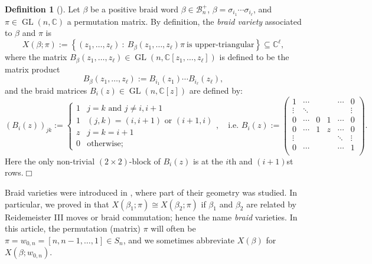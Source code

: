 \documentclass[10pt]{amsart}
\theoremstyle{plain}
\theoremstyle{definition}
\newtheorem{definition}[thm]{Definition}
\theoremstyle{remark}
\numberwithin{equation}{section}
\newcommand{\sse}{\subseteq}
\newcommand{\GL}{\operatorname{GL}}
\newcommand{\bC}{\mathbb{C}}
\newcommand{\cB}{\mathcal{B}}
\newcommand{\Br}{\mathrm{Br}}
\newcommand{\MG}[1]{{\color{teal}{{\bf Misha}: #1}}}
\begin{document}
\begin{definition}[\cite{CGGS}]\label{def:braid_var}
Let $\beta$ be a positive braid word $\beta\in \cB^+_n$, $\beta=\sigma_{i_1}\cdots \sigma_{i_\ell}$, and $\pi\in \GL(n,\bC)$ a permutation matrix. By definition, the {\em braid variety} associated to $\beta$ and $\pi$ is
$$
X(\beta;\pi):=\left\{(z_1,\ldots,z_\ell)\ :\ B_\beta(z_1,\ldots,z_{\ell})\pi\ \text{is upper-triangular}\right\}\sse \bC^{\ell},
$$
where the matrix $B_{\beta}(z_1,\ldots,z_{\ell})\in \GL(n,\bC[z_1,\ldots,z_\ell])$ is defined to be the matrix product
$$
B_{\beta}(z_1,\ldots,z_{\ell}):=B_{i_1}(z_1)\cdots B_{i_\ell}(z_{\ell}),
$$
and the braid matrices $B_i(z)\in \GL(n,\bC[z])$ are defined by:
\[
(B_i(z))_{jk} := \begin{cases} 1 & j=k \text{ and } j\neq i,i+1 \\
1 & (j,k) = (i,i+1) \text{ or } (i+1,i) \\
z & j=k=i+1 \\
0 & \text{otherwise;}
\end{cases},\quad\mbox{i.e. }
B_i(z):=\left(\begin{matrix}
1 & \cdots  & & & \cdots & 0\\
\vdots & \ddots & & & & \vdots\\
0 & \cdots & 0 & 1 & \cdots & 0\\
0 & \cdots & 1 & z & \cdots & 0\\
\vdots &  & & &\ddots & \vdots\\
0 & \cdots & & & \cdots & 1\\
\end{matrix}\right).
\]
Here the only non-trivial $(2\times 2)$-block of $B_i(z)$ is at the $i$th and $(i+1)$st rows.\hfill$\Box$
\end{definition}

Braid varieties were introduced in \cite{CGGS,Mellit}, where part of their geometry was studied. In particular, we proved in \cite{CGGS} that $X(\beta_1;\pi)\cong X(\beta_2;\pi)$ if %
$\beta_1$ and $\beta_2$ are related by Reidemeister III moves or braid commutation; hence the name {\it braid} varieties. In this article, the permutation (matrix) $\pi$ will often be $\pi=w_{0,n}=[n, n-1, \ldots, 1]\in S_n$, and we sometimes abbreviate $X(\beta)$ for $X(\beta;w_{0,n})$.
\end{document}
